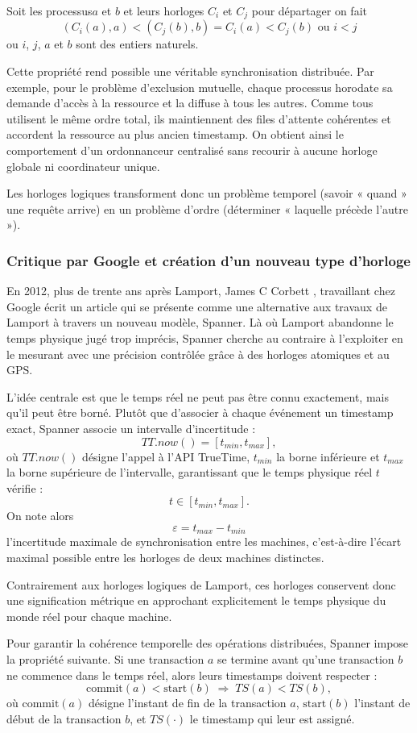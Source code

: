 \documentclass[12pt,a4paper]{article}
\begin{document}
Soit les processus$a$ et $b$ et leurs horloges $C_i$ et $C_j$ pour départager on fait
$$
(C_i(a),a)<(C_j(b),b) = C_i(a) < C_j(b) \text{ ou } i < j
$$
ou $i$, $j$, $a$ et $b$ sont des entiers naturels.

Cette propriété rend possible une véritable synchronisation distribuée. Par exemple, pour le problème d’exclusion mutuelle, chaque processus horodate sa demande d’accès à la ressource et la diffuse à tous les autres. Comme tous utilisent le même ordre total, ils maintiennent des files d’attente cohérentes et accordent la ressource au plus ancien timestamp. On obtient ainsi le comportement d’un ordonnanceur centralisé sans recourir à aucune horloge globale ni coordinateur unique.

Les horloges logiques transforment donc un problème temporel (savoir « quand » une requête arrive) en un problème d’ordre (déterminer « laquelle précède l’autre »).

\subsubsection{Critique par Google et création d'un nouveau type d'horloge}
En 2012, plus de trente ans après Lamport, James C Corbett \cite{Spanner2012}, travaillant chez Google écrit un article qui se présente comme une alternative aux travaux de Lamport à travers un nouveau modèle, Spanner. Là où Lamport abandonne le temps physique jugé trop imprécis, Spanner cherche au contraire à l'exploiter en le mesurant avec une précision contrôlée grâce à des horloges atomiques et au GPS.

L'idée centrale est que le temps réel ne peut pas être connu exactement, mais qu'il peut être borné. Plutôt que d'associer à chaque événement un timestamp exact, Spanner associe un intervalle d'incertitude :
\[
TT.now() = [t_{min}, t_{max}],
\]
où $TT.now()$ désigne l'appel à l'API TrueTime, $t_{min}$ la borne inférieure et $t_{max}$ la borne supérieure de l'intervalle, garantissant que le temps physique réel $t$ vérifie :
\[
t \in [t_{min}, t_{max}].
\]
On note alors
\[
\varepsilon = t_{max} - t_{min}
\]
l'incertitude maximale de synchronisation entre les machines, c'est-à-dire l'écart maximal possible entre les horloges de deux machines distinctes.

Contrairement aux horloges logiques de Lamport, ces horloges conservent donc une signification métrique en approchant explicitement le temps physique du monde réel pour chaque machine.

Pour garantir la cohérence temporelle des opérations distribuées, Spanner impose la propriété suivante. Si une transaction $a$ se termine avant qu'une transaction $b$ ne commence dans le temps réel, alors leurs timestamps doivent respecter :
\[
\text{commit}(a) < \text{start}(b) \;\Rightarrow\; TS(a) < TS(b),
\]
où $\text{commit}(a)$ désigne l'instant de fin de la transaction $a$, $\text{start}(b)$ l'instant de début de la transaction $b$, et $TS(\cdot)$ le timestamp qui leur est assigné.
\end{document}
